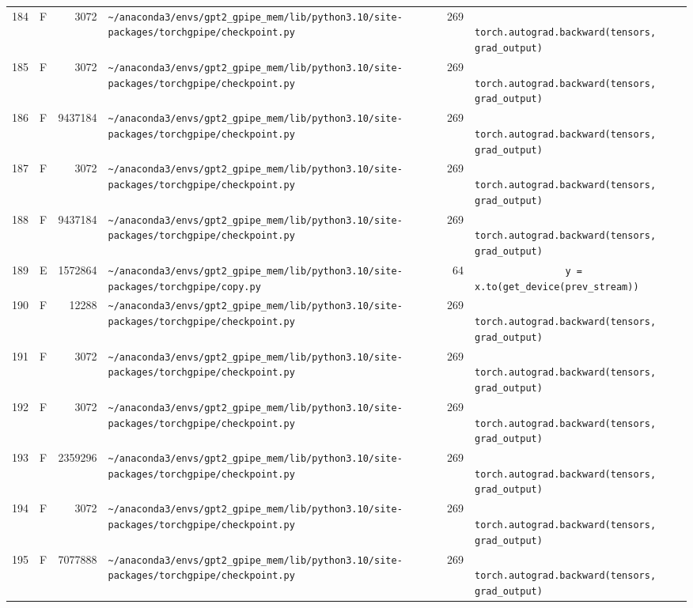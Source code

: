 \documentclass{article}
\begin{document}
\begin{longtable}{r l r p{6.5cm} r p{7.0cm}}
184 & F & 3072 & \lstinline|~/anaconda3/envs/gpt2_gpipe_mem/lib/python3.10/site-packages/torchgpipe/checkpoint.py| & 269 & \lstinline|            torch.autograd.backward(tensors, grad_output)| \\
185 & F & 3072 & \lstinline|~/anaconda3/envs/gpt2_gpipe_mem/lib/python3.10/site-packages/torchgpipe/checkpoint.py| & 269 & \lstinline|            torch.autograd.backward(tensors, grad_output)| \\
186 & F & 9437184 & \lstinline|~/anaconda3/envs/gpt2_gpipe_mem/lib/python3.10/site-packages/torchgpipe/checkpoint.py| & 269 & \lstinline|            torch.autograd.backward(tensors, grad_output)| \\
187 & F & 3072 & \lstinline|~/anaconda3/envs/gpt2_gpipe_mem/lib/python3.10/site-packages/torchgpipe/checkpoint.py| & 269 & \lstinline|            torch.autograd.backward(tensors, grad_output)| \\
188 & F & 9437184 & \lstinline|~/anaconda3/envs/gpt2_gpipe_mem/lib/python3.10/site-packages/torchgpipe/checkpoint.py| & 269 & \lstinline|            torch.autograd.backward(tensors, grad_output)| \\
189 & E & 1572864 & \lstinline|~/anaconda3/envs/gpt2_gpipe_mem/lib/python3.10/site-packages/torchgpipe/copy.py| & 64 & \lstinline|                y = x.to(get_device(prev_stream))| \\
190 & F & 12288 & \lstinline|~/anaconda3/envs/gpt2_gpipe_mem/lib/python3.10/site-packages/torchgpipe/checkpoint.py| & 269 & \lstinline|            torch.autograd.backward(tensors, grad_output)| \\
191 & F & 3072 & \lstinline|~/anaconda3/envs/gpt2_gpipe_mem/lib/python3.10/site-packages/torchgpipe/checkpoint.py| & 269 & \lstinline|            torch.autograd.backward(tensors, grad_output)| \\
192 & F & 3072 & \lstinline|~/anaconda3/envs/gpt2_gpipe_mem/lib/python3.10/site-packages/torchgpipe/checkpoint.py| & 269 & \lstinline|            torch.autograd.backward(tensors, grad_output)| \\
193 & F & 2359296 & \lstinline|~/anaconda3/envs/gpt2_gpipe_mem/lib/python3.10/site-packages/torchgpipe/checkpoint.py| & 269 & \lstinline|            torch.autograd.backward(tensors, grad_output)| \\
194 & F & 3072 & \lstinline|~/anaconda3/envs/gpt2_gpipe_mem/lib/python3.10/site-packages/torchgpipe/checkpoint.py| & 269 & \lstinline|            torch.autograd.backward(tensors, grad_output)| \\
195 & F & 7077888 & \lstinline|~/anaconda3/envs/gpt2_gpipe_mem/lib/python3.10/site-packages/torchgpipe/checkpoint.py| & 269 & \lstinline|            torch.autograd.backward(tensors, grad_output)| \\

\end{longtable}
\end{document}
